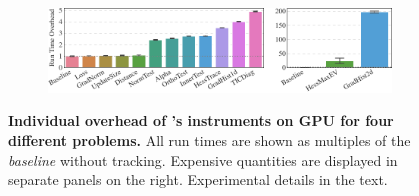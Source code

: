 \begin{figure}[p]
\begin{subfigure}[t]{\linewidth}
    \includegraphics{../repos/cockpit-paper/fig/01_benchmark/output/fig_individual/benchmark_combined_fmnist_2c2d_cuda_thesis-wide}
    \label{cockpit::fig:app_benchmark_instruments_cuda-fmnist}
  \end{subfigure}
  \vfill
  \caption{\textbf{Individual overhead of \cockpittitle's instruments on GPU for
      four different problems.} All run times are shown as multiples of the
    \emph{baseline} without tracking. Expensive quantities are displayed in
    separate panels on the right. Experimental details in the text.}
  \label{cockpit::fig:app_benchmark_instruments_cuda}
\end{figure}

\captionsetup[subfigure]{justification=centering, singlelinecheck=true}

